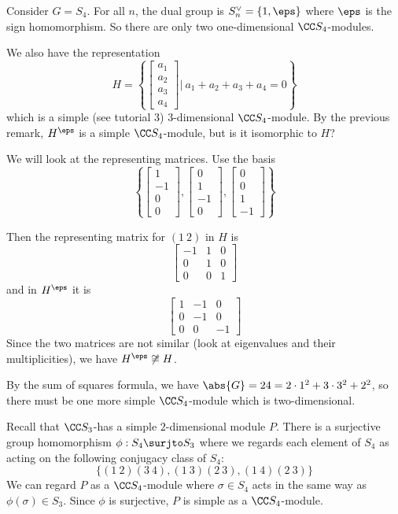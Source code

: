 \begin{exam}
	Consider $G=S_4$.
	For all $n$, the dual group is $S_n^\vee = \{1,\eps\}$ where $\eps$ is the sign homomorphism.
	So there are only two one-dimensional $\CC S_4$-modules.
	
	We also have the representation
	\[H=\left\{
	\begin{bmatrix}
		a_1 \\ a_2 \\ a_3 \\a_4
	\end{bmatrix}
	\Bigg \vert \
	a_1+a_2+a_3+a_4=0
	\right\}\]
	which is a simple (see tutorial 3) $3$-dimensional $\CC S_4$-module.
	By the previous remark, $H^\eps$ is a simple $\CC S_4$-module, but is it isomorphic to $H$?
	
	We will look at the representing matrices.
	Use the basis
	\[\left\{
	\begin{bmatrix}
		1 \\ -1 \\ 0 \\0
	\end{bmatrix},
	\begin{bmatrix}
	0 \\1 \\ -1 \\ 0
	\end{bmatrix},
	\begin{bmatrix}
	0 \\ 0 \\ 1 \\ -1
	\end{bmatrix}
	\right\}\]
	
	Then the representing matrix for $(1\ 2)$ in $H$ is
	\[\begin{bmatrix}
		-1 & 1 & 0 \\
		0 & 1 & 0 \\
		0 & 0 & 1
	\end{bmatrix}\]
	and in $H^\eps$ it is	
	\[\begin{bmatrix}
		1 & -1 & 0 \\
		0 & -1 & 0 \\
		0 & 0 & -1
	\end{bmatrix}\]
	Since the two matrices are not similar (look at eigenvalues and their multiplicities), we have $H^\eps \not\cong H$.
	
	By the sum of squares formula, we have $\abs{G}=24=2 \cdot 1^2 + 3 \cdot 3^2 + 2^2$, so there must be one more simple $\CC S_4$-module which is two-dimensional.
	
	Recall that $\CC S_3$-has a simple $2$-dimensional module $P$.
	There is a surjective group homomorphism $\phi: S_4 \surjto S_3$ where we regards each element of $S_4$ as acting on the following conjugacy class of $S_4$:
	\[\{(1\ 2)(3\ 4), (1\ 3)(2\ 3), (1\ 4)(2\ 3)\}\]
	We can regard $P$ as a $\CC S_4$-module where $\sigma \in S_4$ acts in the same way as $\phi(\sigma) \in S_3$.
	Since $\phi$ is surjective, $P$ is simple as a $\CC S_4$-module.
\end{exam}
